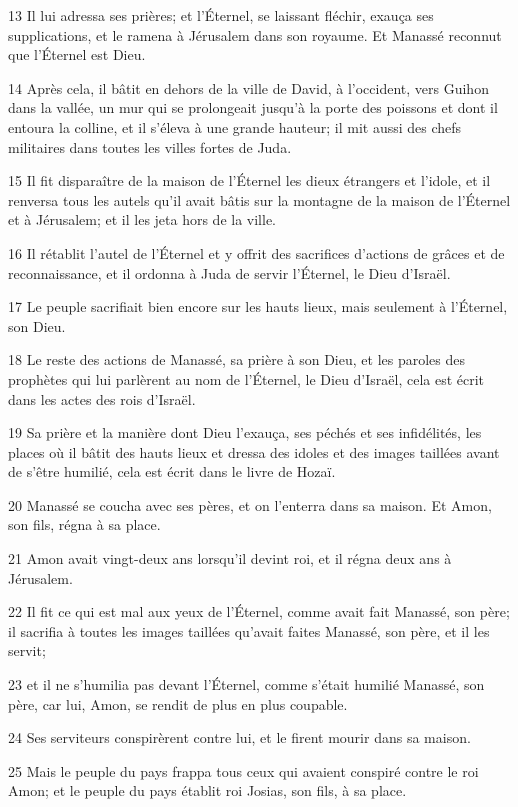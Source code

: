 \par 13 Il lui adressa ses prières; et l'Éternel, se laissant fléchir, exauça ses supplications, et le ramena à Jérusalem dans son royaume. Et Manassé reconnut que l'Éternel est Dieu.
\par 14 Après cela, il bâtit en dehors de la ville de David, à l'occident, vers Guihon dans la vallée, un mur qui se prolongeait jusqu'à la porte des poissons et dont il entoura la colline, et il s'éleva à une grande hauteur; il mit aussi des chefs militaires dans toutes les villes fortes de Juda.
\par 15 Il fit disparaître de la maison de l'Éternel les dieux étrangers et l'idole, et il renversa tous les autels qu'il avait bâtis sur la montagne de la maison de l'Éternel et à Jérusalem; et il les jeta hors de la ville.
\par 16 Il rétablit l'autel de l'Éternel et y offrit des sacrifices d'actions de grâces et de reconnaissance, et il ordonna à Juda de servir l'Éternel, le Dieu d'Israël.
\par 17 Le peuple sacrifiait bien encore sur les hauts lieux, mais seulement à l'Éternel, son Dieu.
\par 18 Le reste des actions de Manassé, sa prière à son Dieu, et les paroles des prophètes qui lui parlèrent au nom de l'Éternel, le Dieu d'Israël, cela est écrit dans les actes des rois d'Israël.
\par 19 Sa prière et la manière dont Dieu l'exauça, ses péchés et ses infidélités, les places où il bâtit des hauts lieux et dressa des idoles et des images taillées avant de s'être humilié, cela est écrit dans le livre de Hozaï.
\par 20 Manassé se coucha avec ses pères, et on l'enterra dans sa maison. Et Amon, son fils, régna à sa place.
\par 21 Amon avait vingt-deux ans lorsqu'il devint roi, et il régna deux ans à Jérusalem.
\par 22 Il fit ce qui est mal aux yeux de l'Éternel, comme avait fait Manassé, son père; il sacrifia à toutes les images taillées qu'avait faites Manassé, son père, et il les servit;
\par 23 et il ne s'humilia pas devant l'Éternel, comme s'était humilié Manassé, son père, car lui, Amon, se rendit de plus en plus coupable.
\par 24 Ses serviteurs conspirèrent contre lui, et le firent mourir dans sa maison.
\par 25 Mais le peuple du pays frappa tous ceux qui avaient conspiré contre le roi Amon; et le peuple du pays établit roi Josias, son fils, à sa place.

